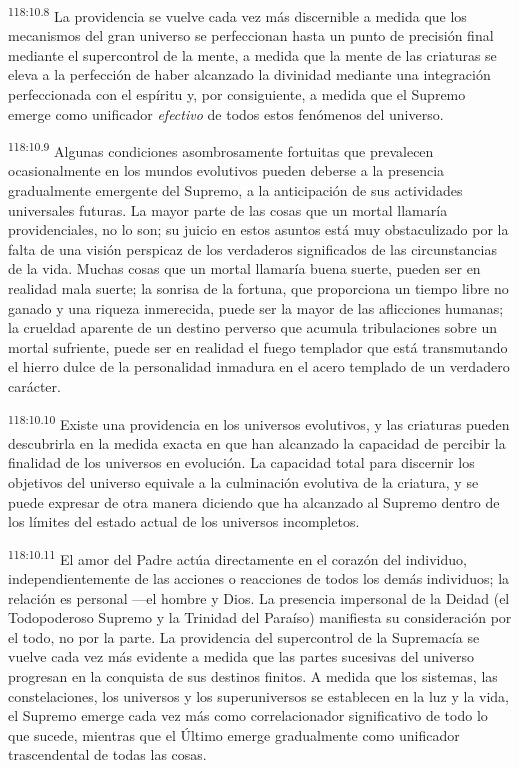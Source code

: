 \par
\textsuperscript{118:10.8} La providencia se vuelve cada vez más discernible a medida que los mecanismos del gran universo se perfeccionan hasta un punto de precisión final mediante el supercontrol de la mente, a medida que la mente de las criaturas se eleva a la perfección de haber alcanzado la divinidad mediante una integración perfeccionada con el espíritu y, por consiguiente, a medida que el Supremo emerge como unificador \textit{efectivo} de todos estos fenómenos del universo.

\par
\textsuperscript{118:10.9} Algunas condiciones asombrosamente fortuitas que prevalecen ocasionalmente en los mundos evolutivos pueden deberse a la presencia gradualmente emergente del Supremo, a la anticipación de sus actividades universales futuras. La mayor parte de las cosas que un mortal llamaría providenciales, no lo son; su juicio en estos asuntos está muy obstaculizado por la falta de una visión perspicaz de los verdaderos significados de las circunstancias de la vida. Muchas cosas que un mortal llamaría buena suerte, pueden ser en realidad mala suerte; la sonrisa de la fortuna, que proporciona un tiempo libre no ganado y una riqueza inmerecida, puede ser la mayor de las aflicciones humanas; la crueldad aparente de un destino perverso que acumula tribulaciones sobre un mortal sufriente, puede ser en realidad el fuego templador que está transmutando el hierro dulce de la personalidad inmadura en el acero templado de un verdadero carácter.

\par
\textsuperscript{118:10.10} Existe una providencia en los universos evolutivos, y las criaturas pueden descubrirla en la medida exacta en que han alcanzado la capacidad de percibir la finalidad de los universos en evolución. La capacidad total para discernir los objetivos del universo equivale a la culminación evolutiva de la criatura, y se puede expresar de otra manera diciendo que ha alcanzado al Supremo dentro de los límites del estado actual de los universos incompletos.

\par
\textsuperscript{118:10.11} El amor del Padre actúa directamente en el corazón del individuo, independientemente de las acciones o reacciones de todos los demás individuos; la relación es personal ---el hombre y Dios. La presencia impersonal de la Deidad (el Todopoderoso Supremo y la Trinidad del Paraíso) manifiesta su consideración por el todo, no por la parte. La providencia del supercontrol de la Supremacía se vuelve cada vez más evidente a medida que las partes sucesivas del universo progresan en la conquista de sus destinos finitos. A medida que los sistemas, las constelaciones, los universos y los superuniversos se establecen en la luz y la vida, el Supremo emerge cada vez más como correlacionador significativo de todo lo que sucede, mientras que el Último emerge gradualmente como unificador trascendental de todas las cosas.

